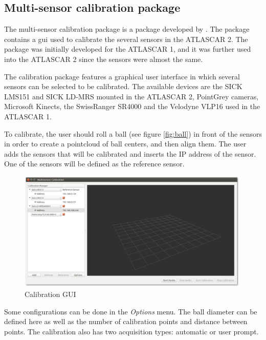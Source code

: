 \subsection{Multi-sensor calibration package}

The multi-sensor calibration package is a package developed by \cite{VieiradaSilva2016}. The package contains a \gls{gui} used to calibrate the several sensors in the ATLASCAR 2. The package was initially developed for the ATLASCAR 1, and it was further used into the ATLASCAR 2 since the sensors were almost the same.

The calibration package features a graphical user interface in which several sensors can be selected to be calibrated. The available devices are the SICK LMS151 and SICK LD-MRS mounted in the ATLASCAR 2, PointGrey cameras, Microsoft Kinects, the SwissRanger SR4000 and the Velodyne VLP16 used in the ATLASCAR 1.

To calibrate, the user should roll a ball (see figure \ref{fig:ball}) in front of the sensors in order to create a pointcloud of ball centers, and then align them. The user adds the sensors that will be calibrated and inserts the IP address of the sensor. One of the sensors will be defined as the reference sensor. 

\begin{figure}[htp]
	
	\centering
	\includegraphics[width=0.99\textwidth]{capcalib/imgs/calibgui.png}
	
	\caption{Calibration GUI}
	\label{fig:calibgui}
	
\end{figure}

Some configurations can be done in the \textit{Options} menu. The ball diameter can be defined here as well as the number of calibration points and distance between points. The calibration also has two acquisition types: automatic or user prompt. 

